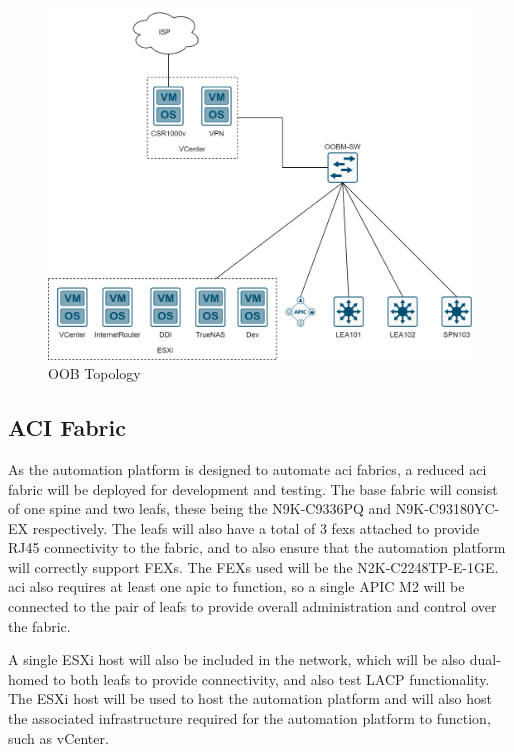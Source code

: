 \begin{figure}[H]
    \centering

    \includegraphics[scale=0.25]{images/oob-topology.png}
    \caption{OOB
        Topology}
    \label{fig:oob-topology}
\end{figure}

\subsection{ACI Fabric}
\label{design:Testbed:network-design}
As the automation platform is designed to
automate \gls{aci} fabrics, a reduced \gls{aci} fabric will be deployed for
development and testing. The base fabric will consist of one spine and two
leafs, these being the N9K-C9336PQ and N9K-C93180YC-EX respectively. The leafs
will also have a total of 3 \gls{fex}s attached to provide RJ45 connectivity to
the fabric, and to also ensure that the automation platform will correctly
support FEXs. The FEXs used will be the N2K-C2248TP-E-1GE. \gls{aci} also
requires at least one \gls{apic} to function, so a single APIC M2 will be
connected to the pair of leafs to provide overall administration and control
over the fabric.

A single ESXi host will also be included in the network,
which will be also dual-homed to both leafs to provide connectivity, and also
test LACP functionality. The ESXi host will be used to host the automation
platform and will also host the associated infrastructure required for the
automation platform to function, such as vCenter.

